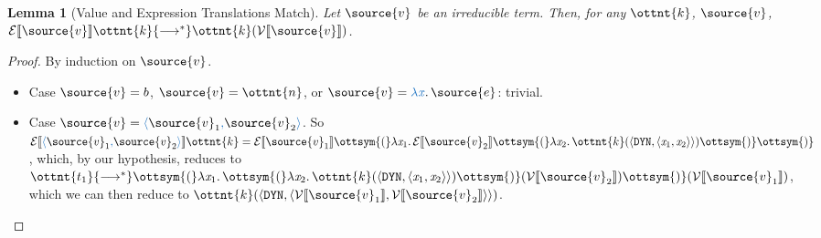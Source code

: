 \documentclass[11pt]{article}
\newcommand{\blue}[1]{ {\color{RoyalBlue}{{#1}}} }
\newtheorem{lemma}{Lemma}[section]
\begin{document}
\begin{lemma}[Value and Expression Translations Match]
	\label{lem:value-expr-trans}
	Let $\source{v}$ be an irreducible term. Then, for any $\ottnt{k}$, $\source{v}$, $ \mathcal{E}\llbracket  \source{v}  \rrbracket  \ottnt{k}   {\longrightarrow^{*} }   \ottnt{k} (  \mathcal{V}\llbracket  \source{v}  \rrbracket  ) $.
\end{lemma}
\begin{proof}
	By induction on $\source{v}$. 

	\begin{itemize}
		\item Case $\source{v} = b$, $\source{v} = \ottnt{n}$, or $\source{v} =  \blue{\lambda  \mathit{x} }  \ldotp  \source{e} $: trivial.
		\item Case $\source{v} =  \blue{\langle}  \source{v}_{{\mathrm{1}}}  \blue{,}  \source{v}_{{\mathrm{2}}}  \blue{\rangle} $.
		      So $ \mathcal{E}\llbracket   \blue{\langle}  \source{v}_{{\mathrm{1}}}  \blue{,}  \source{v}_{{\mathrm{2}}}  \blue{\rangle}   \rrbracket  \ottnt{k}  =   \mathcal{E}\llbracket  \source{v}_{{\mathrm{1}}}  \rrbracket  \ottsym{(}  \lambda  \mathit{x_{{\mathrm{1}}}}  \ldotp   \mathcal{E}\llbracket  \source{v}_{{\mathrm{2}}}  \rrbracket  \ottsym{(}  \lambda  \mathit{x_{{\mathrm{2}}}}  \ldotp   \ottnt{k} (  \langle   \mathtt{ DYN }  ,   \langle  \mathit{x_{{\mathrm{1}}}} ,  \mathit{x_{{\mathrm{2}}}} \rangle  \rangle  )   \ottsym{)}   \ottsym{)}  $,
		      which, by our hypothesis, reduces to  $\ottnt{t_{{\mathrm{1}}}}  {\longrightarrow^{*} }   \ottsym{(}  \lambda  \mathit{x_{{\mathrm{1}}}}  \ldotp   \ottsym{(}  \lambda  \mathit{x_{{\mathrm{2}}}}  \ldotp   \ottnt{k} (  \langle   \mathtt{ DYN }  ,   \langle  \mathit{x_{{\mathrm{1}}}} ,  \mathit{x_{{\mathrm{2}}}} \rangle  \rangle  )   \ottsym{)} (  \mathcal{V}\llbracket  \source{v}_{{\mathrm{2}}}  \rrbracket  )   \ottsym{)} (  \mathcal{V}\llbracket  \source{v}_{{\mathrm{1}}}  \rrbracket  ) $,
		      which we can then reduce to $ \ottnt{k} (  \langle   \mathtt{ DYN }  ,   \langle   \mathcal{V}\llbracket  \source{v}_{{\mathrm{1}}}  \rrbracket  ,   \mathcal{V}\llbracket  \source{v}_{{\mathrm{2}}}  \rrbracket  \rangle  \rangle  ) $.

\end{itemize}
\end{proof}
\end{document}
